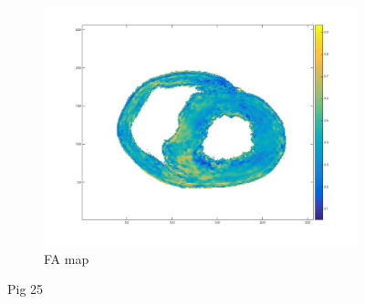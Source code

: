 \begin{figure}
\begin{subfigure}{.31\textwidth}
        \includegraphics[width=\textwidth]{figures/pig25_fa_30}
        \caption{FA map}
        \label{fig:pig25_fa}
    \end{subfigure}
    \caption{Pig 25}
    \label{fig:pig25}
\end{figure}

